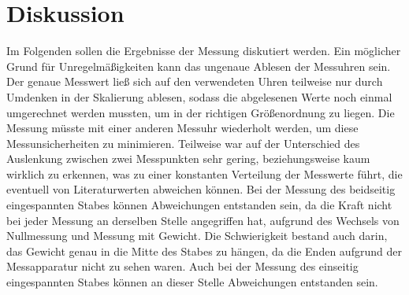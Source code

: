 \section{Diskussion}

Im Folgenden sollen die Ergebnisse der Messung diskutiert werden.
Ein möglicher Grund für Unregelmäßigkeiten kann das ungenaue Ablesen der Messuhren sein.
Der genaue Messwert ließ sich auf den verwendeten Uhren teilweise nur durch Umdenken in der Skalierung 
ablesen, sodass die abgelesenen Werte noch einmal umgerechnet werden mussten, um in der richtigen 
Größenordnung zu liegen. Die Messung müsste mit einer anderen Messuhr wiederholt werden, um diese 
Messunsicherheiten zu minimieren.
Teilweise war auf der Unterschied des Auslenkung zwischen zwei Messpunkten sehr gering, beziehungsweise 
kaum wirklich zu erkennen, was zu einer konstanten Verteilung der Messwerte führt, die eventuell von
Literaturwerten abweichen können.
Bei der Messung des beidseitig eingespannten Stabes können Abweichungen entstanden sein, da 
die Kraft nicht bei jeder Messung an derselben Stelle angegriffen hat, aufgrund des Wechsels von Nullmessung
und Messung mit Gewicht. Die Schwierigkeit bestand auch darin, das Gewicht genau in die Mitte des Stabes 
zu hängen, da die Enden aufgrund der Messapparatur nicht zu sehen waren.
Auch bei der Messung des einseitig eingespannten Stabes können an dieser Stelle Abweichungen entstanden sein.

